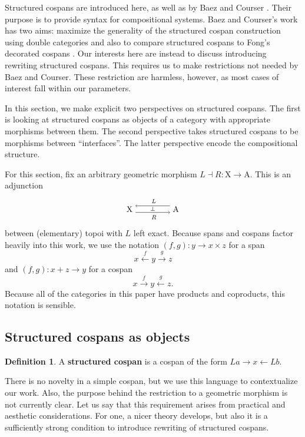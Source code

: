 \documentclass{amsart}
\newcommand{\A}{\cat{A}}
\newcommand{\X}{\cat{X}}
\newcommand{\defn}[1]{\textbf{#1}}
\newcommand{\cat}[1]{\mathrm{#1}}
\newcommand{\from}{\colon}
\newcommand{\xto}[1]{\xrightarrow{#1}}
\renewcommand{\gets}{\leftarrow}
\newcommand{\xgets}[1]{\xleftarrow{#1}}
\newcommand{\spn}[3]{#2 \to #1 \times #3}
\newcommand{\csp}[3]{#1 + #3 \to #2}
\theoremstyle{remark}
\theoremstyle{definition}
\newtheorem{definition}[theorem]{Definition}
\newcommand{\adjunction}[4]{%
  \begin{tikzpicture}[baseline=-3pt]
    \node (1) at (0,0) {\( #1 \)};
    \node (2) at (2,0) {\( #4 \)};
    \draw [->]
    ([yshift= 4pt]2.west) to
    node [above] {\scriptsize{ $ #2 $ }}
    ([yshift= 4pt]1.east);
    \draw [->]
    ([yshift= -4pt]1.east) to
    node [below] {\scriptsize{ $ #3 $ }}
    node [above,yshift= -1.5pt] {\scriptsize{$ \perp $}}
    ([yshift= -4pt]2.west);
  \end{tikzpicture}
}
\begin{document}
Structured cospans are introduced here, as well as by Baez and Courser
\cite{StrCsp}. Their purpose is to provide syntax for compositional
systems. Baez and Courser's work has two aims: maximize the generality
of the structured cospan construction using double categories and also
to compare structured cospans to Fong's decorated cospans
\cite{DecorCsp}. Our interests here are instead to discuss introducing
rewriting structured cospans. This requires us to make restrictions
not needed by Baez and Courser.  These restriction are harmless,
however, as most cases of interest fall within our parameters.

In this section, we make explicit two perspectives on structured
cospans.  The first is looking at structured cospans as objects of a
category with appropriate morphisms between them. The second
perspective takes structured cospans to be morphisms between
``interfaces''.  The latter perspective encode the compositional
structure.

For this section, fix an arbitrary geometric morphism
$ L \dashv R \from \X \to \A $. This is an adjunction
%
\[
  \adjunction{\X}{L}{R}{\A}
\]
%
between (elementary) topoi with $ L $ left exact. Because spans and
cospans factor heavily into this work, we use the notation
%
\(
 (f,g) \from \spn{x}{y}{z}
\)
% 
for a span
%
\[
  x \xgets{f} y \xto{g} z
\]
%
and
%
\(
  (f,g) \from \csp{x}{y}{z}
\)
% 
for a cospan
%
\[
  x \xto{f} y \xgets{g} z.
\]
% 
Because all of the categories in this paper have products and
coproducts, this notation is sensible.


\subsection{Structured cospans as objects}
\label{sec:StrCspAsObject}

\begin{definition}\label{df:strcsp}
  A \defn{ structured cospan } is a cospan of the form
  $ La \to x \gets Lb $. 
\end{definition}

There is no novelty in a simple cospan, but we use this language to
contextualize our work. Also, the purpose behind the restriction to a
geometric morphism is not currently clear. Let us say that this
requirement arises from practical and aesthetic considerations. For
one, a nicer theory develops, but also it is a sufficiently strong
condition to introduce rewriting of structured cospans.
\end{document}

